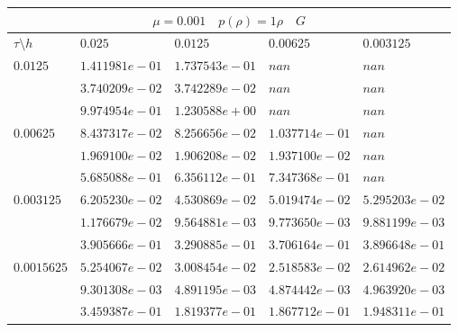 \documentclass[a4paper,12pt]{extarticle}
\begin{document}
\begin{tabular}{|l|l|l|l|l|}
	\hline
	\multicolumn{5}{|c|}{$\mu =0.001 \quad  p(\rho) =1 \rho \quad G$}\\
	\hline
	$\tau\setminus h$ & $0.025$ & $0.0125$ & $0.00625$ & $0.003125$\\
	\hline
	$0.0125$  & $1.411981e-01$ & $1.737543e-01$ & $nan$ & $nan$\\
	& $3.740209e-02$ & $3.742289e-02$ & $nan$ & $nan$\\
	& $9.974954e-01$ & $1.230588e+00$ & $nan$ & $nan$\\
	\hline
	$0.00625$  & $8.437317e-02$ & $8.256656e-02$ & $1.037714e-01$ & $nan$\\
	& $1.969100e-02$ & $1.906208e-02$ & $1.937100e-02$ & $nan$\\
	& $5.685088e-01$ & $6.356112e-01$ & $7.347368e-01$ & $nan$\\
	\hline
	$0.003125$  & $6.205230e-02$ & $4.530869e-02$ & $5.019474e-02$ & $5.295203e-02$\\
	& $1.176679e-02$ & $9.564881e-03$ & $9.773650e-03$ & $9.881199e-03$\\
	& $3.905666e-01$ & $3.290885e-01$ & $3.706164e-01$ & $3.896648e-01$\\
	\hline
	$0.0015625$  & $5.254067e-02$ & $3.008454e-02$ & $2.518583e-02$ & $2.614962e-02$\\
	& $9.301308e-03$ & $4.891195e-03$ & $4.874442e-03$ & $4.963920e-03$\\
	& $3.459387e-01$ & $1.819377e-01$ & $1.867712e-01$ & $1.948311e-01$\\
	\hline
\end{tabular}
\end{document}

